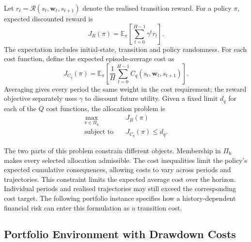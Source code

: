 \documentclass[10pt]{article}
\begin{document}
Let $r_t=\mathcal R(s_t,\bm w_t,s_{t+1})$ denote the realised transition reward. For a policy $\pi$, expected discounted reward is
\begin{equation}
  J_R(\pi)
    =\mathbb E_\pi\!\left[
       \sum_{t=0}^{H-1}\gamma^t r_t\right].
  \label{eq:reward-return}
\end{equation}
The expectation includes initial-state, transition and policy randomness. For each cost function, define the expected episode-average cost as
\begin{equation}
  J_{C_q}(\pi)
    =\mathbb E_\pi\!\left[
       \frac1H\sum_{t=0}^{H-1}C_q(s_t,\bm w_t,s_{t+1})\right].
  \label{eq:cost-return}
\end{equation}
Averaging gives every period the same weight in the cost requirement; the reward objective separately uses $\gamma$ to discount future utility. Given a fixed limit $d_q$ for each of the $Q$ cost functions, the allocation problem is
\begin{equation}
  \begin{aligned}
    \max_{\pi\in\Pi_{\mathrm h}}\quad &J_R(\pi)\\
    \text{subject to}\quad
      &J_{C_q}(\pi)\leq d_q.
  \end{aligned}
  \label{eq:hybrid-problem}
\end{equation}

The two parts of this problem constrain different objects. Membership in $\Pi_{\mathrm h}$ makes every selected allocation admissible. The cost inequalities limit the policy's expected cumulative consequences, allowing costs to vary across periods and trajectories. This constraint limits the expected average cost over the horizon. Individual periods and realised trajectories may still exceed the corresponding cost target. The following portfolio instance specifies how a history-dependent financial risk can enter this formulation as a transition cost.

\subsection{Portfolio Environment with Drawdown Costs}
\end{document}
